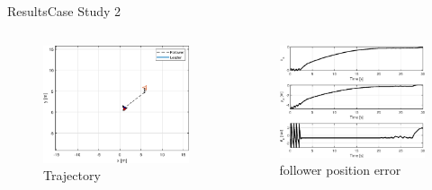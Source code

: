 \documentclass{beamer}
\begin{document}
\begin{frame}{Results}{Case Study 2}
\begin{columns}
\begin{column}{0.5\textwidth}
\begin{figure}
\includegraphics[scale=0.4]{figs/matlab/actorCritic/CaseStudy2/trajectory.eps}
\caption{Trajectory}
\end{figure}
\end{column}

\begin{column}{0.5\textwidth}
\begin{center}

\begin{figure}
\includegraphics[scale=0.4]{figs/matlab/actorCritic/CaseStudy2/error.eps}
\caption{follower position error}
\end{figure}
\end{center}

\end{column}

\end{columns}

\end{frame}
\end{document}

